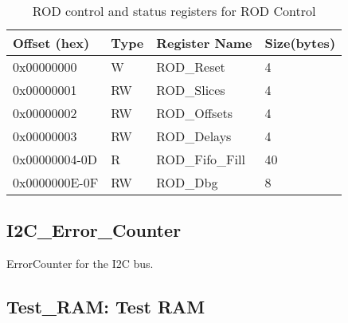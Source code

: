 \begin {table}[H]
\begin{center}
\caption {ROD control and status registers for ROD Control}
\label{rod_control_run}
\begin{tabular}{|l|l|l|l|}
\hline
Offset (hex)& Type & Register Name & Size(bytes)\\
\hline
0x00000000 & W & ROD\_Reset & 4 \\
\hline
0x00000001 & RW & ROD\_Slices & 4 \\
\hline
0x00000002 & RW & ROD\_Offsets & 4 \\
\hline
0x00000003 & RW & ROD\_Delays & 4 \\
\hline
0x00000004-0D & R & ROD\_Fifo\_Fill & 40 \\
\hline
0x0000000E-0F & RW & ROD\_Dbg & 8 \\
\hline
\end{tabular}
\end{center}
\end{table}




\subsection{I2C\_Error\_Counter}
ErrorCounter for the I2C bus.





\subsection{Test\_RAM: Test RAM}



